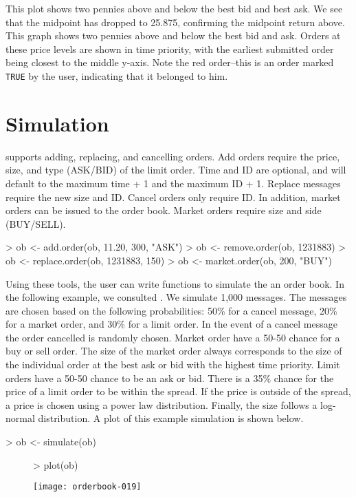 \documentclass[a4paper]{report}
\begin{document}
\begin{article}
This plot shows two pennies above and below the best bid and best
ask. We see that the midpoint has dropped to 25.875, confirming the
midpoint return above. This graph shows two pennies above and below
the best bid and ask. Orders at these price levels are shown in time
priority, with the earliest submitted order being closest to the
middle y-axis. Note the red order--this is an order marked
\texttt{TRUE} by the user, indicating that it belonged to him.

\section{Simulation}

 supports adding, replacing, and cancelling orders. Add
orders require the price, size, and type (ASK/BID) of the limit
order. Time and ID are optional, and will default to the maximum time
+ 1 and the maximum ID + 1. Replace messages require the new size and
ID. Cancel orders only require ID. In addition, market orders can be
issued to the order book. Market orders require size and side
(BUY/SELL).

\begin{Schunk}
\begin{Sinput}
> ob <- add.order(ob, 11.20, 300, "ASK")
> ob <- remove.order(ob, 1231883)
> ob <- replace.order(ob, 1231883, 150)
> ob <- market.order(ob, 200, "BUY")
\end{Sinput}
\end{Schunk}

Using these tools, the user can write functions to simulate the an
order book. In the following example, we consulted
\cite{gilles:daniel}. We simulate 1,000 messages.  The messages are
chosen based on the following probabilities: 50\% for a cancel
message, 20\% for a market order, and 30\% for a limit order. In the
event of a cancel message the order cancelled is randomly
chosen. Market order have a 50-50 chance for a buy or sell order. The
size of the market order always corresponds to the size of the
individual order at the best ask or bid with the highest time
priority. Limit orders have a 50-50 chance to be an ask or bid. There
is a 35\% chance for the price of a limit order to be within the
spread. If the price is outside of the spread, a price is chosen using
a power law distribution. Finally, the size follows a log-normal
distribution. A  plot of this example simulation is shown below.


\begin{Schunk}
\begin{Sinput}
> ob <- simulate(ob)
\end{Sinput}
\end{Schunk}
\begin{figure}
\centering
\vspace*{.1in}
\begin{Schunk}
\begin{Sinput}
> plot(ob)
\end{Sinput}
\end{Schunk}
\texttt{[image: orderbook-019]}
\end{figure}


\end{article}
\end{document}
